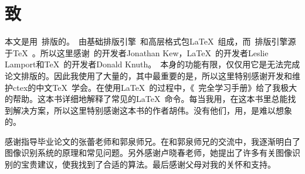 
\chapter*{致}

本文是用\XeLaTeX~排版的。\XeLaTeX~由基础排版引擎\XeTeX~和高层格式包\LaTeX~组成，而\XeTeX~排版引擎源于\TeX~。所以这里感谢\XeTeX~的开发者Jonathan Kew，\LaTeX~的开发者Leslie Lamport和\TeX~的开发者Donald Knuth。\XeLaTeX~本身的功能有限，仅仅用它是无法完成论文排版的。因此我使用了大量的，其中最重要的是，所以这里特别感谢开发和维护ctex的中文\TeX~学会。在使用\LaTeX~的过程中，《\LaTeXe~完全学习手册》给了我极大的帮助。这本书详细地解释了常见的\LaTeX~命令。每当我用，在这本书里总能找到解决方案，所以这里特别感谢这本书的作者胡伟。没有他们，用，是难以想象的。

感谢指导毕业论文的张蕾老师和郭泉师兄。在和郭泉师兄的交流中，我逐渐明白了图像识别系统的原理和常见问题。另外感谢卢晓春老师，她提出了许多有关图像识别的宝贵建议，使我找到了合适的算法。最后感谢父母对我的关怀和支持。
